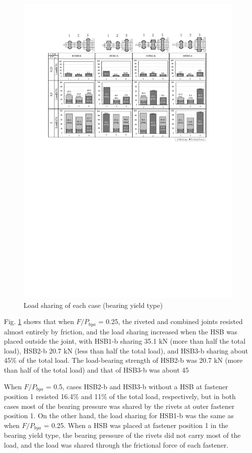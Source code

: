 \begin{figure}[htbp]
\centering
\includegraphics[width=\textwidth]{imgs/ch4/fig18.pdf}
\caption{Load sharing of each case (bearing yield type)}
\label{ch4fig18}
\end{figure}

Fig. \ref{ch4fig18} shows that when $F / P_{bya}$ = 0.25, the riveted and combined joints resisted almost entirely by friction, and the load sharing increased when the \ac{HSB} was placed outside the joint, with HSB1-b sharing 35.1 kN (more than half the total load), HSB2-b 20.7 kN (less than half the total load), and HSB3-b sharing about 45\% of the total load. The load-bearing strength of HSB2-b was 20.7 kN (more than half of the total load) and that of HSB3-b was about 45%

When $F / P_{bya}$ = 0.5, cases HSB2-b and HSB3-b without a \ac{HSB} at fastener position 1 resisted 16.4\% and 11\% of the total load, respectively, but in both cases most of the bearing pressure was shared by the rivets at outer fastener position 1. On the other hand, the load sharing for HSB1-b was the same as when $F / P_{bya}$ = 0.25. When a \ac{HSB} was placed at fastener position 1 in the bearing yield type, the bearing pressure of the rivets did not carry most of the load, and the load was shared through the frictional force of each fastener.

